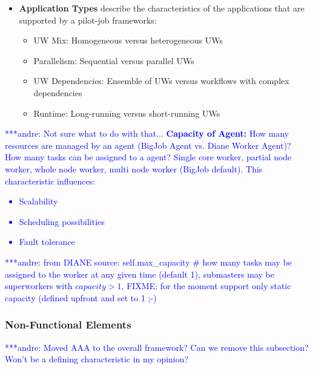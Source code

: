 \documentclass[conference,final]{IEEEtran}
\newcommand{\jhanote}[1]{ {\textcolor{red} { ***shantenu: #1 }}}
\newcommand{\alnote}[1]{ {\textcolor{blue} { ***andre: #1 }}}
\newcommand{\alnote}[1]{}
\newcommand{\jhanote}[1]{}
\begin{document}
\begin{itemize}
\item \textbf{Application Types} describe the characteristics of the 
applications that are supported by a pilot-job frameworks:
\begin{itemize}
    \item UW Mix: Homogeneous versus heterogeneous UWs
    \item Parallelism: Sequential versus parallel UWs
    \item UW Dependencies: Ensemble of UWs versus workflows with complex 
    dependencies
    \item Runtime: Long-running versus short-running UWs
\end{itemize}
\end{itemize}

\alnote{Not sure what to do with that...
\textbf{Capacity of Agent:} How many resources are managed by an agent (BigJob Agent vs. Diane Worker Agent)? How many tasks can be assigned to a agent? Single core worker, partial node worker, whole node worker, multi node worker (BigJob
default). This characteristic influences: 
    \begin{itemize}
        \item Scalability
        \item Scheduling possibilities
        \item Fault tolerance
    \end{itemize}
    \alnote{from DIANE source: self.max\_capacity \# how many tasks may be 
    assigned to the worker at any given time (default 1), submasters may be 
    superworkers with $capacity>1$, FIXME: for the moment support only static 
    capacity (defined upfront and set to 1 ;-)}    
}





\subsubsection{Non-Functional Elements}

\alnote{Moved AAA to the overall framework? Can we remove this subsection? Won't be a defining characteristic in my opinion?}
\end{document}
